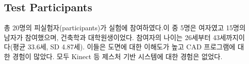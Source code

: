 \subsection{Test Participants}
총 20명의 피실험자(participants)가 실험에 참여하였다.이 중 5명은 여자였고 15명의 남자가 참여했으며, 건축학과 대학원생이었다. 참여자의 나이는 26세부터 43세까지이다(평균 33.6세, SD 4.87세). 이들은 도면에 대한 이해도가 높고 CAD 프로그램에 대한 경험이 많았다. 모두 Kinect 등 제스처 기반 시스템에 대한 경험은 없었다. %



